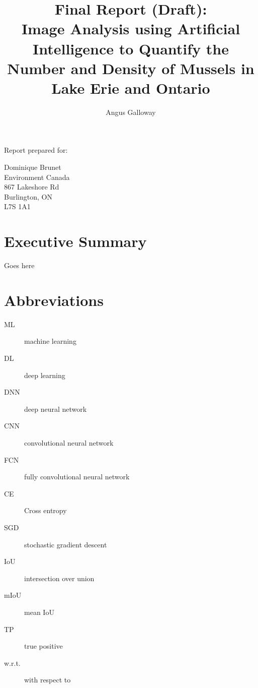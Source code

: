 \documentclass[11pt]{article} %
\title{Final Report (Draft): \\
Image Analysis using Artificial Intelligence to
Quantify the Number and Density of Mussels in Lake Erie and Ontario}
\author{Angus Galloway}
\begin{document}
\maketitle

\thispagestyle{empty}

\vspace{5cm}

\begin{centering}

Report prepared for:

\vspace{1cm}

Dominique Brunet \\ 
Environment Canada \\ 
867 Lakeshore Rd \\
Burlington, ON \\
L7S 1A1 

\end{centering}

\clearpage


\setcounter{page}{1}

\section*{Executive Summary}

Goes here

\clearpage

\tableofcontents

\clearpage

\section*{Abbreviations}

\begin{description}
\item[ML] machine learning
\item[DL] deep learning
\item[DNN] deep neural network
\item[CNN] convolutional neural network
\item[FCN] fully convolutional neural network
\item[CE] Cross entropy
\item[SGD] stochastic gradient descent
\item[IoU] intersection over union
\item[mIoU] mean IoU
\item[TP] true positive
\item[w.r.t.] with respect to
\end{description}
\end{document}
